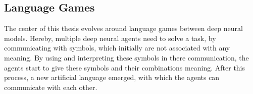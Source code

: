 \subsection{Language Games}
\label{sec:background:language-games}

The center of this thesis evolves around language games between deep neural models.
Hereby, multiple deep neural agents need to solve a task, by communicating with symbols, which initially are not associated with any meaning.
By using and interpreting these symbols in there communication, the agents start to give these symbols and their combinations meaning.
After this process, a new artificial language emerged, with which the agents can communicate with each other.

